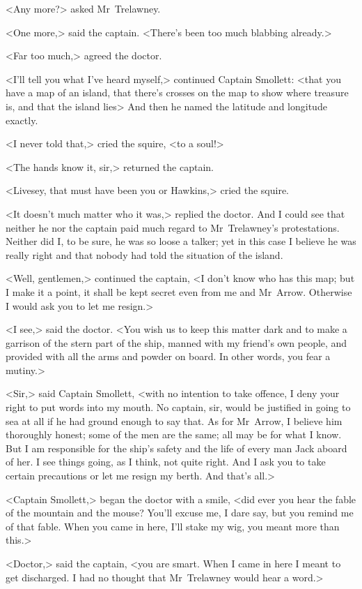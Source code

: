 <Any more?> asked Mr~Trelawney.

<One more,> said the captain. <There's been too much blabbing already.>

<Far too much,> agreed the doctor.

<I'll tell you what I've heard myself,> continued Captain Smollett: <that you have a map of an island, that there's crosses on the map to show where treasure is, and that the island lies\longdash> And then he named the latitude and longitude exactly.

<I never told that,> cried the squire, <to a soul!>

<The hands know it, sir,> returned the captain.

<Livesey, that must have been you or Hawkins,> cried the squire.

<It doesn't much matter who it was,> replied the doctor. And I could see that neither he nor the captain paid much regard to Mr~Trelawney's protestations. Neither did I, to be sure, he was so loose a talker; yet in this case I believe he was really right and that nobody had told the situation of the island.

<Well, gentlemen,> continued the captain, <I don't know who has this map; but I make it a point, it shall be kept secret even from me and Mr~Arrow. Otherwise I would ask you to let me resign.>

<I see,> said the doctor. <You wish us to keep this matter dark and to make a garrison of the stern part of the ship, manned with my friend's own people, and provided with all the arms and powder on board. In other words, you fear a mutiny.>

<Sir,> said Captain Smollett, <with no intention to take offence, I deny your right to put words into my mouth. No captain, sir, would be justified in going to sea at all if he had ground enough to say that. As for Mr~Arrow, I believe him thoroughly honest; some of the men are the same; all may be for what I know. But I am responsible for the ship's safety and the life of every man Jack aboard of her. I see things going, as I think, not quite right. And I ask you to take certain precautions or let me resign my berth. And that's all.>

<Captain Smollett,> began the doctor with a smile, <did ever you hear the fable of the mountain and the mouse? You'll excuse me, I dare say, but you remind me of that fable. When you came in here, I'll stake my wig, you meant more than this.>

<Doctor,> said the captain, <you are smart. When I came in here I meant to get discharged. I had no thought that Mr~Trelawney would hear a word.>

